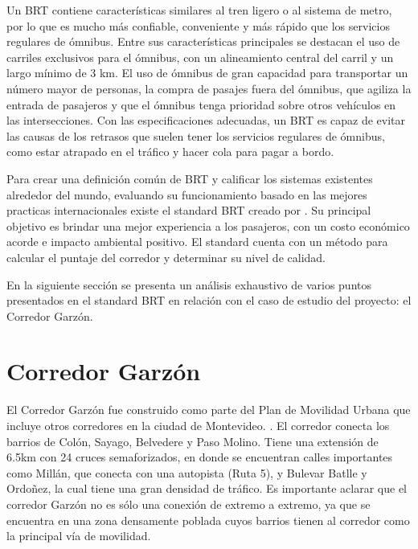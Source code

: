 Un BRT contiene características similares al tren ligero o al sistema de metro, por lo que es mucho más confiable, conveniente y más rápido que los servicios regulares de ómnibus. Entre sus características principales se destacan el uso de carriles exclusivos para el ómnibus, con un alineamiento central del carril y un largo mínimo de 3 km. El uso de ómnibus de gran capacidad para transportar un número mayor de personas, la compra de pasajes fuera del ómnibus, que agiliza la entrada de pasajeros y que el ómnibus tenga prioridad sobre otros vehículos en las intersecciones. Con las especificaciones adecuadas, un BRT es capaz de evitar las causas de los retrasos que suelen tener los servicios regulares de ómnibus, como estar atrapado en el tráfico y hacer cola para pagar a bordo. 

Para crear una definición común de BRT y calificar los sistemas existentes alrededor del mundo,  evaluando su funcionamiento basado en las mejores practicas internacionales existe el standard BRT creado por \citet{brt_standar}. Su principal objetivo es brindar una mejor experiencia a los pasajeros, con un costo económico acorde e impacto ambiental positivo. El standard cuenta con un método para calcular el puntaje del corredor y determinar su nivel de calidad. 

En la siguiente sección se presenta un análisis exhaustivo de varios puntos presentados en el standard BRT en relación con el caso de estudio del proyecto: el Corredor Garzón.

	
\section{Corredor Garzón}	


El Corredor Garzón fue construido como parte del Plan de Movilidad Urbana que incluye otros corredores en la ciudad de Montevideo. \citep{PlanMovilidad}. El corredor conecta los barrios de Colón, Sayago, Belvedere y Paso Molino. Tiene una extensión de 6.5km con 24 cruces semaforizados, en donde se encuentran calles importantes como Millán, que conecta con una autopista (Ruta 5), y Bulevar Batlle y Ordoñez, la cual tiene una gran densidad de tráfico. Es importante aclarar que el corredor Garzón no es sólo una conexión de extremo a extremo, ya que se encuentra en una zona densamente poblada cuyos barrios tienen al corredor como la principal vía de movilidad.


